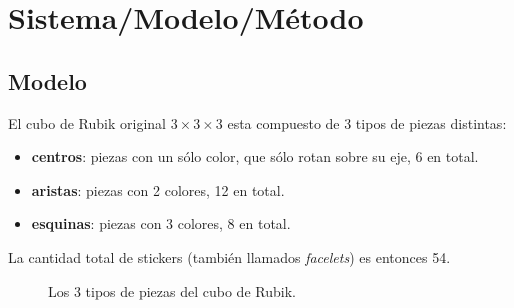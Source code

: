 \chapter{Sistema/Modelo/Método}

\section{Modelo}
El cubo de Rubik original $3 \times 3 \times 3$ esta compuesto de 3 tipos de piezas distintas:
\begin{itemize}
	\item \textbf{centros}: piezas con un sólo color, que sólo rotan sobre su eje, 6 en total.
	\item \textbf{aristas}: piezas con 2 colores, 12 en total.
	\item \textbf{esquinas}: piezas con 3 colores, 8 en total.
\end{itemize}
La cantidad total de stickers (también llamados \textit{facelets}) es entonces 54.
\begin{figure}[h!]
	\centering
	\hfill
	\hfill
	\caption{Los 3 tipos de piezas del cubo de Rubik.}
\end{figure}

